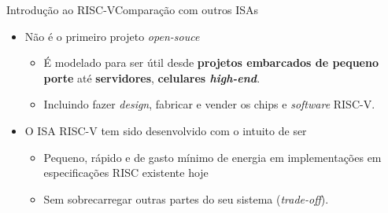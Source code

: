 \documentclass[red, aspectratio=169, xcolor=dvipsnames]{beamer}
\let\olditem=\item%
\renewcommand{\item}{\olditem \justifying}
\begin{document}
\begin{frame}{Introdução ao RISC-V}{Comparação com outros ISAs}
	\begin{itemize}
		\setlength{\itemsep}{1em}
		
		\item Não é o primeiro projeto \textit{open-souce}
		\begin{itemize}
			\item É modelado para ser útil desde \textbf{projetos embarcados de pequeno porte} até \textbf{servidores}, \textbf{celulares \textit{high-end}}.
			
			\item Incluindo fazer \textit{design}, fabricar e vender os chips e \textit{software} RISC-V.
		\end{itemize}

		\item O ISA RISC-V tem sido desenvolvido com o intuito de ser 
		\begin{itemize}
			\item Pequeno, rápido e de gasto mínimo de energia em implementações em especificações RISC existente hoje
			
			\item Sem sobrecarregar outras partes do seu sistema (\textit{trade-off}).
		\end{itemize}
	\end{itemize}
\end{frame}
\end{document}

